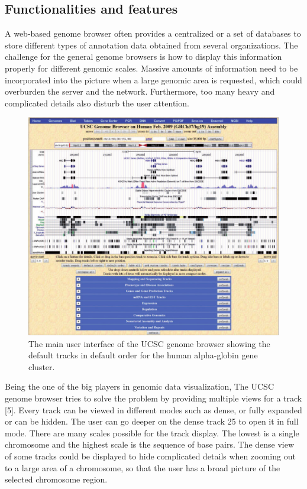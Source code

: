 \subsection{Functionalities and features}

A web-based genome browser often provides a centralized or a set of databases to store different types of annotation data obtained from several organizations. 
The challenge for the general genome browsers is how to display this information properly for different genomic scales. 
Massive amounts of information need to be incorporated into the picture when a large genomic area is requested, which could overburden the server and the network. 
Furthermore, too many heavy and complicated details also disturb the user attention. 

\begin{figure}[!ht]
	\centering
	\includegraphics[width=.9\textwidth]{figures/ucsc_gb.png}
	\caption{The main user interface of the UCSC genome browser showing the default tracks in default order for the human alpha-globin gene cluster.\label{o:latex_friendly_zone}}
\end{figure}

Being the one of the big players in genomic data visualization, The UCSC genome browser tries to solve the problem by providing multiple views for a track [5]. 
Every track can be viewed in different modes such as dense, or fully expanded or can be hidden. 
The user can go deeper on the dense track 25 to open it in full mode. 
There are many scales possible for the track display. 
The lowest is a single chromosome and the highest scale is the sequence of base pairs.
The dense view of some tracks could be displayed to hide complicated details when zooming out to a large area of a chromosome, so that the user has a broad picture of the selected chromosome region.

